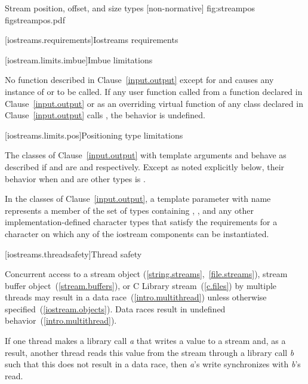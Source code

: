 \begin{importgraphic}
{Stream position, offset, and size types [non-normative]}
{fig:streampos}
{figstreampos.pdf}
\end{importgraphic}

[iostreams.requirements]{Iostreams requirements}

[iostream.limits.imbue]{Imbue limitations}

\pnum
No function described in Clause~\ref{input.output} except for
and 
causes any instance of
or
to be called.
If any user function called from a function declared in Clause~\ref{input.output} or
as an overriding virtual function of any class declared in Clause~\ref{input.output}
calls
,
the behavior is undefined.

[iostreams.limits.pos]{Positioning type limitations}

\pnum
The classes of Clause~\ref{input.output} with template arguments
and
behave as described if
and
are
and
respectively.
Except as noted explicitly below, their behavior when
and
are other types is
%
.

\pnum
In the classes of Clause~\ref{input.output}, a template parameter with name
 represents a member of the set of types containing , ,
and any other implementation-defined character types that satisfy the requirements for
a character on which any of the iostream components can be instantiated.

[iostreams.threadsafety]{Thread safety}

\pnum
Concurrent access to a stream object (\ref{string.streams},~\ref{file.streams}), stream buffer
object~(\ref{stream.buffers}), or C Library stream~(\ref{c.files}) by multiple threads may result in
a data race~(\ref{intro.multithread}) unless otherwise specified~(\ref{iostream.objects}).
\enternote Data races result in undefined behavior~(\ref{intro.multithread}). \exitnote

\pnum
If one thread makes a library call \textit{a} that writes a value to a stream
and, as a result, another thread reads this value from the stream through a
library call \textit{b} such that this does not result in a data race, then
\textit{a}'s write synchronizes with
\textit{b}'s read.

